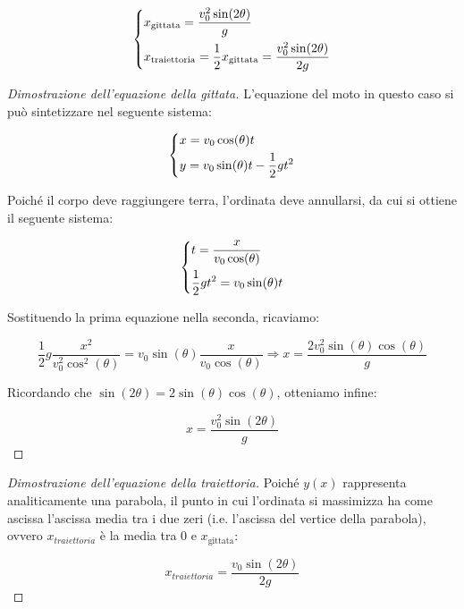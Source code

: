 \documentclass[oneside]{book}
\begin{document}
\begin{equation}
    \displaystyle
    \begin{dcases}
        x_{\text{gittata}} = \frac{v_0^2 \sin(2\theta)}{g} \\
        x_{\text{traiettoria}} = \frac12 x_{\text{gittata}} = \frac{v_0^2 \sin(2\theta)}{2g}
    \end{dcases}
\end{equation}

\begin{proof}[Dimostrazione dell'equazione della gittata]
    L'equazione del moto in questo caso si può sintetizzare nel
    seguente sistema:

    \begin{equation*}
        \begin{dcases}
            x=v_0\cos(\theta)t  \\
            y=v_0\sin(\theta)t -\frac12gt^2
        \end{dcases}
    \end{equation*}

    Poiché il corpo deve raggiungere terra, l'ordinata deve
    annullarsi, da cui si ottiene il seguente sistema:

    \begin{equation*}
        \begin{dcases}
            t=\frac{x}{v_0\cos(\theta)} \\
            \frac12gt^2=v_0\sin(\theta)t 
        \end{dcases}
    \end{equation*}

    Sostituendo la prima equazione nella seconda, ricaviamo:

    \begin{equation*}
        \frac12 g \frac{x^2}{v_0^2 \cos^2(\theta)}=v_0\sin(\theta) \frac{x}{v_0\cos(\theta)} \Rightarrow x=\frac{2 v_0^2 \sin(\theta) \cos(\theta)}{g}
    \end{equation*}

    Ricordando che $\sin(2\theta)=2\sin(\theta)\cos(\theta)$, otteniamo infine:

    \begin{equation*}
        x=\frac{v_0^2 \sin(2\theta)}{g}
    \end{equation*}
\end{proof}

\begin{proof}[Dimostrazione dell'equazione della traiettoria]
    Poiché $y(x)$ rappresenta analiticamente una parabola, il punto in cui
    l'ordinata si massimizza ha come ascissa
    l'ascissa media tra i due zeri (i.e. l'ascissa del vertice della
    parabola), ovvero $x_{traiettoria}$ è la media tra $0$ e
    $x_{\text{gittata}}$:

    \begin{equation*}
        x_{traiettoria}=\frac{v_0\sin(2\theta)}{2g}
    \end{equation*}
\end{proof}
\end{document}
